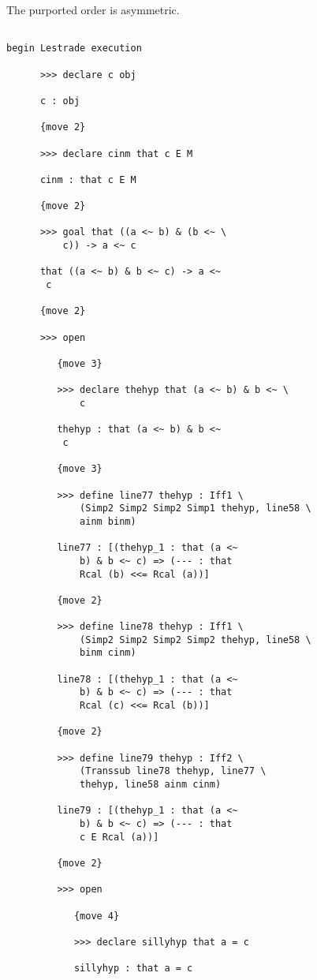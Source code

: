 \documentclass[12pt]{article}
\begin{document}
The purported order is asymmetric.

\begin{verbatim}

begin Lestrade execution

      >>> declare c obj

      c : obj

      {move 2}

      >>> declare cinm that c E M

      cinm : that c E M

      {move 2}

      >>> goal that ((a <~ b) & (b <~ \
          c)) -> a <~ c

      that ((a <~ b) & b <~ c) -> a <~ 
       c

      {move 2}

      >>> open

         {move 3}

         >>> declare thehyp that (a <~ b) & b <~ \
             c

         thehyp : that (a <~ b) & b <~ 
          c

         {move 3}

         >>> define line77 thehyp : Iff1 \
             (Simp2 Simp2 Simp2 Simp1 thehyp, line58 \
             ainm binm)

         line77 : [(thehyp_1 : that (a <~ 
             b) & b <~ c) => (--- : that 
             Rcal (b) <<= Rcal (a))]

         {move 2}

         >>> define line78 thehyp : Iff1 \
             (Simp2 Simp2 Simp2 Simp2 thehyp, line58 \
             binm cinm)

         line78 : [(thehyp_1 : that (a <~ 
             b) & b <~ c) => (--- : that 
             Rcal (c) <<= Rcal (b))]

         {move 2}

         >>> define line79 thehyp : Iff2 \
             (Transsub line78 thehyp, line77 \
             thehyp, line58 ainm cinm)

         line79 : [(thehyp_1 : that (a <~ 
             b) & b <~ c) => (--- : that 
             c E Rcal (a))]

         {move 2}

         >>> open

            {move 4}

            >>> declare sillyhyp that a = c

            sillyhyp : that a = c


\end{verbatim}
\end{document}
